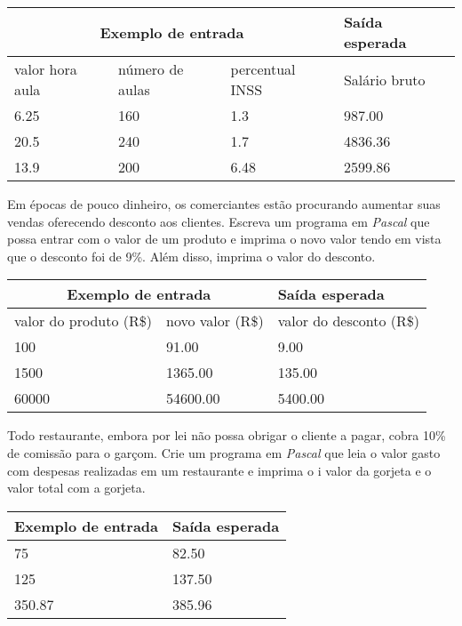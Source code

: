 \begin{center}
\begin{tabular}{|l|l|l|l|} \hline
\multicolumn{3}{|c|}{Exemplo de entrada} & Saída esperada \\ \hline
valor hora aula & número de aulas & percentual INSS   & Salário bruto               \\ \hline
6.25 & 160 & 1.3         & 987.00                \\ \hline
20.5 & 240 & 1.7          & 4836.36             \\ \hline
13.9 & 200 & 6.48         & 2599.86          \\ \hline
\end{tabular}
\end{center}

\item Em épocas de pouco dinheiro, os comerciantes estão procurando aumentar 
suas vendas oferecendo desconto aos clientes. Escreva um programa em 
\emph{Pascal}  que possa entrar com o valor de um produto e imprima o novo 
valor tendo em vista que o desconto foi de 9\%. Além disso, imprima o valor 
do desconto.

\begin{center}
\begin{tabular}{|l|l|l|} \hline
\multicolumn{2}{|c|}{Exemplo de entrada} & Saída esperada \\ \hline
valor do produto (R\$) & novo valor (R\$) & valor do desconto (R\$) \\ \hline
100 & 91.00          & 9.00                \\ \hline
1500 & 1365.00       & 135.00             \\ \hline
60000 & 54600.00     & 5400.00          \\ \hline
\end{tabular}
\end{center}

\item Todo restaurante, embora por lei não possa obrigar o cliente a pagar, 
cobra 10\% de comissão para o garçom. Crie um programa em \emph{Pascal} que 
leia o valor gasto com despesas realizadas em um restaurante e imprima o i
valor da gorjeta e o valor total com a gorjeta.

\begin{center}
\begin{tabular}{|l|l|} \hline
Exemplo de entrada & Saída esperada \\ \hline
75                & 82.50              \\ \hline
125               & 137.50               \\ \hline
350.87            & 385.96               \\ \hline
\end{tabular}
\end{center}

